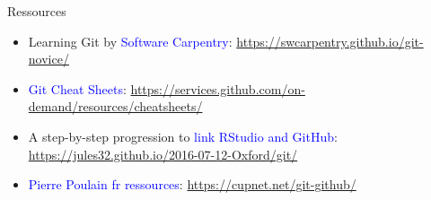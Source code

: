 \begin{frame}{Ressources}
\begin{itemize}
    \item Learning Git by \textcolor{blue}{Software Carpentry}: \url{https://swcarpentry.github.io/git-novice/}
    \item \textcolor{blue}{Git Cheat Sheets}:  \url{https://services.github.com/on-demand/resources/cheatsheets/}
    \item A step-by-step progression to \textcolor{blue}{link RStudio and GitHub}: \url{https://jules32.github.io/2016-07-12-Oxford/git/}
    \item \textcolor{blue}{Pierre Poulain fr ressources}: \url{https://cupnet.net/git-github/}
\end{itemize}
\end{frame}